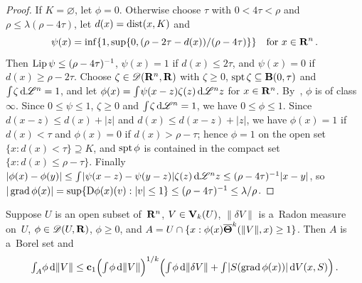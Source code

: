\begin{proof}
    If $K = \varnothing$, let $\phi = 0$. Otherwise choose $\tau$ with $0 < 4 \tau < \rho$ and
    $\rho \le \lambda (\rho - 4 \tau)$, let $d(x) = \operatorname{dist}(x,K)$ and
    \begin{displaymath}
        \psi(x) = \inf \{ 1, \sup \{ 0, (\rho - 2\tau - d(x)) / (\rho - 4 \tau) \} \} \quad
        \text{for $x \in \mathbf{R}^{n}$} \,.
    \end{displaymath}
    Then $\operatorname{Lip} \psi \le (\rho - 4\tau)^{-1}$, $\psi(x) = 1$ if $d(x) \le 2 \tau$, and $\psi(x) = 0$
    if $d(x) \ge \rho - 2 \tau$. Choose $\zeta \in \mathscr{D}(\mathbf{R}^{n},\mathbf{R})$ with $\zeta \ge 0$,
    $\operatorname{spt} \zeta \subseteq \mathbf{B}(0,\tau)$ and ${\textstyle\int_{}^{}} \zeta \,\mathrm{d} \mathscr{L}^{n} = 1$, and let
    $\phi(x) = {\textstyle\int_{}^{}} \psi(x - z) \zeta(z) \,\mathrm{d} \mathscr{L}^{n} z$ for $x \in \mathbf{R}^{n}$. By~\cite[4.1.2]{Federer1969},
    $\phi$ is of class~$\infty$. Since $0 \le \psi \le 1$, $\zeta \ge 0$ and ${\textstyle\int_{}^{}} \zeta \,\mathrm{d} \mathscr{L}^{n} = 1$, we have $0 \le \phi \le 1$. Since $d(x - z) \le d(x) + |z|$
    and $d(x) \le d(x-z) + |z|$, we have $\phi(x) = 1$ if $d(x) < \tau$ and $\phi(x) = 0$ if $d(x)
    > \rho - \tau$; hence $\phi = 1$ on the open set $\{ x : d(x) < \tau \} \supseteq K$, and $\operatorname{spt}
    \phi$ is contained in the compact set $\{ x : d(x) \le \rho - \tau \}$. Finally $|\phi(x) -
    \phi(y)| \le {\textstyle\int_{}^{}} |\psi(x - z) - \psi(y - z)| \zeta(z) \,\mathrm{d} \mathscr{L}^{n} z \le (\rho - 4
    \tau)^{-1} |x - y|$, so $|\operatorname{grad} \phi(x)| = \sup \{ \mathrm{D} \phi(x)(v) : |v| \le 1 \} \le (\rho - 4
    \tau)^{-1} \le \lambda / \rho$.
\end{proof}

\begin{theorem}
    \label{al:7.1}
    Suppose $U$ is an open subset of~$\mathbf{R}^{n}$, $V \in \mathbf{V}_{k}(U)$, $\|\delta V\|$ is
    a~Radon measure on~$U$, $\phi \in \mathscr{D}(U,\mathbf{R})$, $\phi \ge 0$, and $A = U \cap \{ x :
    \phi(x) \boldsymbol{\overline{\Theta}}^{k}(\|V\|,x) \ge 1 \}$. Then $A$ is a~Borel set and
    \begin{displaymath}
        {\textstyle\int_{A}^{}} \phi \,\mathrm{d} \|V\| \le \mathbf{c}_1 \Big( {\textstyle\int_{}^{}} \phi \,\mathrm{d} \|V\| \Big)^{1/k}
        \Big( {\textstyle\int_{}^{}} \phi \,\mathrm{d} \|\delta V\| + {\textstyle\int_{}^{}} |S(\operatorname{grad} \phi(x))| \,\mathrm{d} V(x,S) \Big)
        \,.
    \end{displaymath}
\end{theorem}

